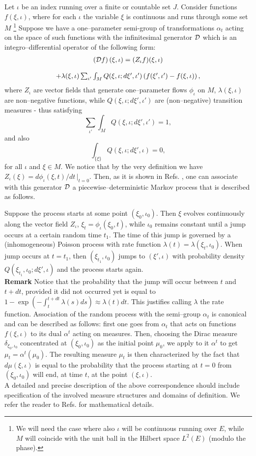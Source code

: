 \documentclass[12pt]{article}
\def\be{\begin{equation}}
\def\ee{\end{equation}}
\def\ba{\begin{array}}
\def\ea{\end{array}}
\begin{document}
Let $\iota$ be an index running over a finite or countable set $J$.
Consider functions $f(\xi ,\iota)$, where for each $\iota$ the variable
$\xi $ is continuous and runs through some set $M$ \footnote{We will need
the case where also $\iota$ will be continuous running over $E$, while $M$
will coincide with the unit ball in the Hilbert space $L^2(E)$ (modulo the
phase).} Suppose we have a one--parameter semi-group of transformations
$\alpha_t$ acting on the space of such functions with the infinitesimal
generator ${\cal D}$ which is an integro--differential operator of the
following form: \be \ba{c} \left({\cal D}f\right)(\xi,\iota) =(Z_\iota
f)(\xi,\iota)\cr\cr + \lambda(\xi,\iota)\sum_{\iota'} \int_M
Q(\xi,\iota;d\xi',\iota') \left( f(\xi',\iota')-f(\xi,\iota)\right)
,\label{eq:gen} \ea \ee where $Z_\iota$ are vector fields that generate
one--parameter flows $\phi_\iota$ on $M$, $\lambda(\xi,\iota)$ are
non--negative functions, while $ Q(\xi,\iota;d\xi',\iota')$ are
(non--negative) transition measures - thus satisfying \be \sum_{\iota'}
\int_M Q(\xi,\iota;d\xi',\iota') =1 , \ee and also \be
\int_{\{\xi\}}Q(\xi,\iota;d\xi',\iota)=0 , \ee for all $\iota$ and $\xi\in
M$. We notice that by the very definition we have $Z_\iota(\xi)=
d\phi_\iota(\xi,t)/dt\, \vert_{t=0}$. Then, as it is shown in Refs.
\cite{davmha1,davmha2}, one can associate with this generator ${\cal D}$ a
piecewise--deterministic Markov process that is described as follows.

Suppose the process starts at some point $(\xi_0 ,\iota_0 )$. Then $\xi$
evolves continuously along the vector field $Z_\iota$,
$\xi_t=\phi_\iota(\xi_0,t)$, while $\iota_0$ remains constant until a jump
occurs at a certain random time $t_1$. The time of this jump is governed by
a (inhomogeneous) Poisson process with rate function
$\lambda(t)=\lambda(\xi_t,\iota_0)$. When jump occurs at $t=t_1$, then
$(\xi_{t_1},\iota_0)$ jumps to $(\xi',\iota)$ with probability density
$Q(\xi_{t_1},\iota_0;d\xi', \iota)$ and the process starts again.\\
\vskip10pt
{\bf Remark} Notice that the probability that the jump will occur between
$t$ and $t+dt$, provided it did not occurred yet is equal to
$1-\exp\left(-\int_t^{t+dt}\lambda(s)ds\right)\approx\lambda(t)dt$. This
justifies calling $\lambda$ the rate function.
\vskip10pt
Association of the random process with the semi--group $\alpha_t$ is
canonical and can be described as follows: first one goes from $\alpha_t$
that acts on functions $f(\xi,\iota)$ to its dual $\alpha^t$ acting on
measures. Then, choosing the Dirac measure $\delta_{\xi_0,\iota_0}$
concentrated at $(\xi_0,\iota_0)$ as the initial point $\mu_0$, we apply to
it $\alpha^t$ to get $\mu_t=\alpha^t(\mu_0)$. The resulting measure $\mu_t$
is then characterized by the fact that $d\mu(\xi,\iota)$ is equal to the
probability that the process starting at $t=0$ from $(\xi_0,\iota_0)$ will
end, at time $t$, at the point $(\xi,\iota)$.\\ A detailed and precise
description of the above correspondence should include specification of the
involved measure structures and domains of definition. We refer the reader
to Refs. \cite{davmha1,davmha2} for mathematical details.
\end{document}
